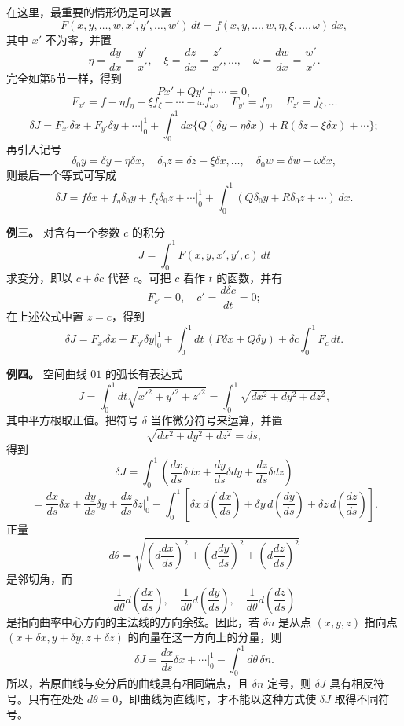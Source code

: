 \documentclass[11pt,a4paper,leqno]{article}
\begin{document}
在这里，最重要的情形仍是可以置
\[
F(x,y,\ldots,w,x',y',\ldots,w')\,dt=f(x,y,\ldots,w,\eta,\xi,\ldots,\omega)\,dx,
\]
其中 \(x'\) 不为零，并置
\[
\eta=\frac{dy}{dx}=\frac{y'}{x'},\quad \xi=\frac{dz}{dx}=\frac{z'}{x'},\ldots,\quad \omega=\frac{dw}{dx}=\frac{w'}{x'}.
\]
完全如第5节一样，得到
\[
Px'+Qy'+\cdots=0,
\]
\[
F_{x'}=f-\eta f_\eta-\xi f_\xi-\cdots-\omega f_\omega,
\quad F_{y'}=f_\eta,\quad F_{z'}=f_\xi,\ldots
\]
\[
\delta J=F_{x'}\delta x+F_{y'}\delta y+\cdots\bigg|_0^1+\int_0^1dx\{Q(\delta y-\eta\delta x)+R(\delta z-\xi\delta x)+\cdots\};
\]
再引入记号
\[
\delta_0y=\delta y-\eta\delta x,\quad \delta_0z=\delta z-\xi\delta x,\ldots,\quad \delta_0w=\delta w-\omega\delta x,
\]
则最后一个等式可写成
\[
\delta J=f\delta x+f_\eta\delta_0y+f_\xi\delta_0z+\cdots\bigg|_0^1
+\int_0^1(Q\delta_0y+R\delta_0z+\cdots)\,dx.
\]

\medskip
\noindent\textbf{例三。} 对含有一个参数 \(c\) 的积分
\[
J=\int_0^1F(x,y,x',y',c)\,dt
\]
求变分，即以 \(c+\delta c\) 代替 \(c\)。可把 \(c\) 看作 \(t\) 的函数，并有
\[
F_{c'}=0,\quad c'=\frac{d\delta c}{dt}=0;
\]
在上述公式中置 \(z=c\)，得到
\[
\delta J=F_{x'}\delta x+F_{y'}\delta y\bigg|_0^1+\int_0^1dt\,(P\delta x+Q\delta y)+\delta c\int_0^1F_c\,dt.
\]

\medskip
\noindent\textbf{例四。} 空间曲线 $01$ 的弧长有表达式
\[
J=\int_0^1dt\sqrt{x'^2+y'^2+z'^2}=\int_0^1\sqrt{dx^2+dy^2+dz^2},
\]
其中平方根取正值。把符号 \(\delta\) 当作微分符号来运算，并置
\[
\sqrt{dx^2+dy^2+dz^2}=ds,
\]
得到
\[
\delta J=\int_0^1\left(\frac{dx}{ds}\delta dx+\frac{dy}{ds}\delta dy+\frac{dz}{ds}\delta dz\right)
\]
\[
=\frac{dx}{ds}\delta x+\frac{dy}{ds}\delta y+\frac{dz}{ds}\delta z\bigg|_0^1
-\int_0^1\left[\delta x\,d\left(\frac{dx}{ds}\right)+\delta y\,d\left(\frac{dy}{ds}\right)+\delta z\,d\left(\frac{dz}{ds}\right)\right].
\]
正量
\[
d\theta=\sqrt{\left(d\frac{dx}{ds}\right)^2+\left(d\frac{dy}{ds}\right)^2+\left(d\frac{dz}{ds}\right)^2}
\]
是邻切角，而
\[
\frac{1}{d\theta}d\left(\frac{dx}{ds}\right),\quad
\frac{1}{d\theta}d\left(\frac{dy}{ds}\right),\quad
\frac{1}{d\theta}d\left(\frac{dz}{ds}\right)
\]
是指向曲率中心方向的主法线的方向余弦。因此，若 \(\delta n\) 是从点 \((x,y,z)\) 指向点 \((x+\delta x,y+\delta y,z+\delta z)\) 的向量在这一方向上的分量，则
\[
\delta J=\frac{dx}{ds}\delta x+\cdots\bigg|_0^1-\int_0^1d\theta\,\delta n.
\]
所以，若原曲线与变分后的曲线具有相同端点，且 \(\delta n\) 定号，则 \(\delta J\) 具有相反符号。只有在处处 \(d\theta=0\)，即曲线为直线时，才不能以这种方式使 \(\delta J\) 取得不同符号。
\end{document}
